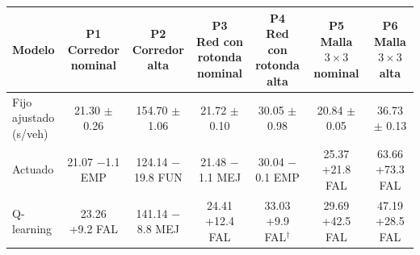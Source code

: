 \begin{table}[H]
\centering
\scriptsize
\setlength{\tabcolsep}{2.5pt}
\begin{tabular}{lcccccc}
\toprule
Modelo & \makecell{P1\\Corredor\\nominal} & \makecell{P2\\Corredor\\alta} & \makecell{P3\\Red con\\rotonda\\nominal} & \makecell{P4\\Red con\\rotonda\\alta} & \makecell{P5\\Malla $3 \times 3$\\nominal} & \makecell{P6\\Malla $3 \times 3$\\alta} \\
\midrule
\makecell[l]{Fijo ajustado\\(s/veh)} & \makecell{21.30\\$\pm$ 0.26} & \makecell{154.70\\$\pm$ 1.06} & \makecell{21.72\\$\pm$ 0.10} & \makecell{30.05\\$\pm$ 0.98} & \makecell{20.84\\$\pm$ 0.05} & \makecell{36.73\\$\pm$ 0.13} \\
\midrule
Actuado & \makecell{21.07\\$-$1.1 EMP} & \makecell{124.14\\$-$19.8 FUN} & \makecell{21.48\\$-$1.1 MEJ} & \makecell{30.04\\$-$0.1 EMP} & \makecell{25.37\\+21.8 FAL} & \makecell{63.66\\+73.3 FAL} \\
Q-learning & \makecell{23.26\\+9.2 FAL} & \makecell{141.14\\$-$8.8 MEJ} & \makecell{24.41\\+12.4 FAL} & \makecell{33.03\\+9.9 FAL$^{\dagger}$} & \makecell{29.69\\+42.5 FAL} & \makecell{47.19\\+28.5 FAL} \\

\end{tabular}
\end{table}
